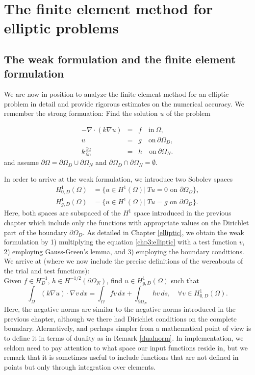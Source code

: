 \chapter{The finite element method for elliptic problems}

\section{The weak formulation and the finite element formulation}

We are now in position to analyze the finite element method
for an elliptic problem in detail and provide rigorous estimates
on the numerical accuracy. We remember the strong formuation:  
Find the solution $u$ of the problem

\begin{eqnarray}
\label{chp3:elliptic}
-\nabla\cdot(k\nabla u)  &=& f \quad \textrm{in}\ \Omega,\\
\label{chp3:Dirichlet}
u&=& g \quad \textrm{on}\ \partial\Omega_D, \\
\label{chp3:Neumann}
k \frac{\partial u}{\partial n}&=& h \quad \textrm{on}\ \partial\Omega_N . 
\end{eqnarray}
and assume $\partial \Omega = \partial \Omega_D \cup \partial \Omega_N$ 
and $\partial \Omega_D \cap \partial \Omega_N = \emptyset$.

In order to arrive at the weak formulation, we introduce two Sobolev spaces
\begin{align}
H^1_{0, D} (\Omega) &= \{ u \in H^1(\Omega)  | \  T u = 0 \mbox{ on } \partial \Omega_D \}, \\   
H^1_{g, D} (\Omega) &= \{ u \in H^1(\Omega)  | \  T u = g \mbox{ on } \partial \Omega_D \}  .  
\end{align}
Here, both spaces are subspaced of the $H^1$ space introduced in the previous chapter which 
include only the functions with appropriate values on the Dirichlet part of the boundary $\partial \Omega_D$.  
As detailed in Chapter \ref{elliptic}, we obtain the weak formulation by 1) multiplying
the equation \eqref{chp3:elliptic} with a test function $v$, 2) employing Gauss-Green's lemma, and 3) employing the 
boundary conditions. We arrive at (where we now include the precise definitions of the wereabouts of the
trial and test functions): \\
Given $f\in H^{-1}_D$, $h\in H^{-1/2}(\partial \Omega_N)$,  
find $u\in  H^1_{g, D} (\Omega)$ such that  
\begin{equation}
\label{cp3:weak} 
\int_\Omega (k \nabla u) \cdot \nabla v \, dx = \int_\Omega f v \, dx + \int_{\partial \Omega_N} h v \, ds, \quad    \forall v\in  H^1_{0, D} (\Omega).  
\end{equation} 
Here, the negative norms are similar to the negative norms introduced in the previous chapter, although we there had Dirichlet conditions
on the complete boundary. Alernatively, and perhaps simpler from a mathematical point of view is to define it in terms of duality as
in Remark \ref{dualnorm}. In implementation, we seldom need to pay attention to what space our input functions reside in, but we remark
that it is sometimes useful to include functions that are not defined in points but only through integration over elements.  

